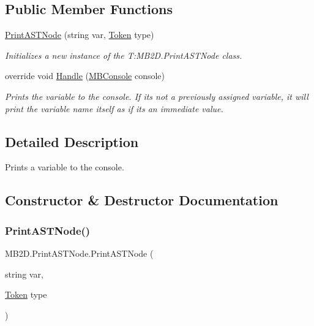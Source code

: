 \subsection*{Public Member Functions}
\begin{DoxyCompactItemize}
\item 
\hyperlink{class_m_b2_d_1_1_print_a_s_t_node_a03dbe726bfbb889dca7929b469ec4a4c}{Print\+A\+S\+T\+Node} (string var, \hyperlink{namespace_m_b2_d_ab170e7e7db86e5ccb0ae156c0d9a6002}{Token} type)
\begin{DoxyCompactList}\small\item\em Initializes a new instance of the T\+:\+M\+B2\+D.\+Print\+A\+S\+T\+Node class. \end{DoxyCompactList}\item 
override void \hyperlink{class_m_b2_d_1_1_print_a_s_t_node_a61d2408e999df07c1190f6ba8bb6ad3f}{Handle} (\hyperlink{class_m_b2_d_1_1_m_b_console}{M\+B\+Console} console)
\begin{DoxyCompactList}\small\item\em Prints the variable to the console. If it\textquotesingle{}s not a previously assigned variable, it will print the variable name itself as if it\textquotesingle{}s an immediate value. \end{DoxyCompactList}\end{DoxyCompactItemize}


\subsection{Detailed Description}
Prints a variable to the console. 



\subsection{Constructor \& Destructor Documentation}
\hypertarget{class_m_b2_d_1_1_print_a_s_t_node_a03dbe726bfbb889dca7929b469ec4a4c}{}\label{class_m_b2_d_1_1_print_a_s_t_node_a03dbe726bfbb889dca7929b469ec4a4c} 
\subsubsection{\texorpdfstring{Print\+A\+S\+T\+Node()}{PrintASTNode()}}
{\footnotesize\ttfamily M\+B2\+D.\+Print\+A\+S\+T\+Node.\+Print\+A\+S\+T\+Node (\begin{DoxyParamCaption}\item[{string}]{var,  }\item[{\hyperlink{namespace_m_b2_d_ab170e7e7db86e5ccb0ae156c0d9a6002}{Token}}]{type }\end{DoxyParamCaption})\hspace{0.3cm}{\ttfamily [inline]}}



